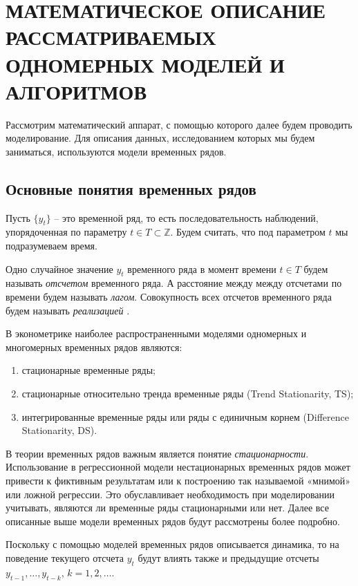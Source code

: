 \documentclass[a4paper, 14pt]{extreport}
\numberwithin{equation}{section}
\numberwithin{equation}{section}
\begin{document}
	\chapter{МАТЕМАТИЧЕСКОЕ ОПИСАНИЕ РАССМАТРИВАЕМЫХ ОДНОМЕРНЫХ МОДЕЛЕЙ И АЛГОРИТМОВ}
	\label{chapter:1}
	
	Рассмотрим математический аппарат, с помощью которого далее будем проводить моделирование. Для описания данных, исследованием которых мы будем заниматься, используются модели временных рядов.
	\section{Основные понятия временных рядов}
	\label{sec:time-series}
	
	Пусть $\{y_t\}$  -- это временной ряд, то есть последовательность наблюдений, упорядоченная по параметру $t\in T \subset \mathbb Z$. Будем считать, что под параметром $t$ мы подразумеваем время.
	
	Одно случайное значение $y_t$ временного ряда в момент времени $t \in T$ будем называть \textit{отсчетом} временного ряда. А расстояние между между отсчетами по времени будем называть \textit{лагом}. Совокупность всех отсчетов временного ряда будем называть \textit{реализацией} \cite{1}.
	
	В эконометрике наиболее распространенными моделями одномерных и многомерных временных рядов являются:
	\begin{enumerate}
		\item стационарные временные ряды;
		\item стационарные относительно тренда временные ряды (Trend Stationarity, TS);
		\item интегрированные временные ряды или ряды с единичным корнем (Difference Stationarity, DS).
	\end{enumerate}
	
	В теории временных рядов важным является понятие \textit{стационарности}. Использование в регрессионной модели нестационарных временных рядов
	может привести к фиктивным результатам или к построению так называемой
	«мнимой» или ложной регрессии. Это обуславливает
	необходимость при моделировании учитывать, являются ли временные ряды
	стационарными или нет. Далее все описанные выше модели временных рядов будут рассмотрены более подробно.
	
	Поскольку с помощью моделей временных рядов описывается динамика, то на поведение текущего отсчета $y_t$ будут влиять также и предыдущие отсчеты $y_{t-1},\ldots, y_{t-k}$, $k=1,2,\ldots$. 
	
\end{document}
